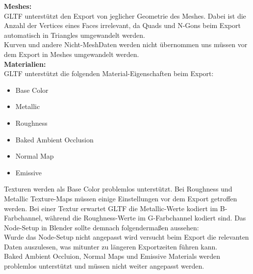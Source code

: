\documentclass[titlepage, a4paper, 11pt]{scrartcl}
\begin{document}
  \textbf{Meshes:}\\
  GLTF unterstützt den Export von jeglicher Geometrie des Meshes. Dabei ist die Anzahl der Vertices eines Faces irrelevant, da Quads und N-Gons beim Export automatisch in Triangles umgewandelt werden.\\
  Kurven und andere \glqq Nicht-Mesh\grqq Daten werden nicht übernommen uns müssen vor dem Export in Meshes umgewandelt werden.\\

  \textbf{Materialien:}\\
  GLTF unterstützt die folgenden Material-Eigenschaften beim Export:
  \begin{itemize}
  \item Base Color
  \item Metallic
  \item Roughness
  \item Baked Ambient Occlusion
  \item Normal Map
  \item Emissive
  \end{itemize}
  Texturen werden als Base Color problemlos unterstützt. Bei Roughness und Metallic Texture-Maps müssen einige Einstellungen vor dem Export getroffen werden. Bei einer Textur erwartet GLTF die Metallic-Werte kodiert im B-Farbchannel, während die Roughness-Werte im G-Farbchannel kodiert sind. Das Node-Setup in Blender sollte demnach folgendermaßen aussehen:\\
  Wurde das Node-Setup nicht angepasst wird versucht beim Export die relevanten Daten auszulesen, was mitunter zu längeren Exportzeiten führen kann.\\
  Baked Ambient Occluion, Normal Maps und Emissive Materials werden problemlos unterstützt und müssen nicht weiter angepasst werden.\\
\end{document}
